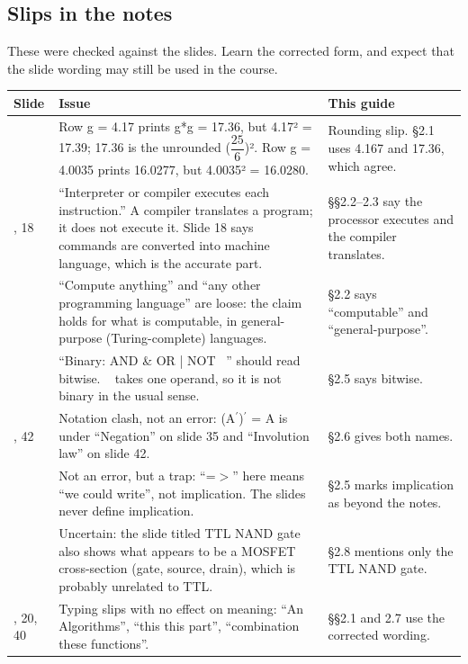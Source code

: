 \documentclass[11pt]{article}
\begin{document}
\begin{keepsection}
\section{Slips in the notes}

These were checked against the slides. Learn the corrected form, and expect that the slide wording may still be used in the course.

\begin{center}\small\begin{tabularx}{\linewidth}{>{\raggedright\arraybackslash}X>{\raggedright\arraybackslash}X>{\raggedright\arraybackslash}X}\toprule
\textbf{Slide} & \textbf{Issue} & \textbf{This guide} \\ \midrule
5 & Row g = 4.17 prints g*g = 17.36, but 4.17² = 17.39; 17.36 is the unrounded ({\small\ensuremath{\dfrac{25}{6}}})². Row g = 4.0035 prints 16.0277, but 4.0035² = 16.0280. & Rounding slip. §2.1 uses 4.167 and 17.36, which agree. \\
9, 18 & “Interpreter or compiler executes each instruction.” A compiler translates a program; it does not execute it. Slide 18 says commands are converted into machine language, which is the accurate part. & §§2.2–2.3 say the processor executes and the compiler translates. \\
10 & “Compute anything” and “any other programming language” are loose: the claim holds for what is computable, in general-purpose (Turing-complete) languages. & §2.2 says “computable” and “general-purpose”. \\
31 & “Binary: AND \& OR | NOT ~” should read bitwise. ~ takes one operand, so it is not binary in the usual sense. & §2.5 says bitwise. \\
35, 42 & Notation clash, not an error: (A\ensuremath{{}^{\prime}})\ensuremath{{}^{\prime}} = A is under “Negation” on slide 35 and “Involution law” on slide 42. & §2.6 gives both names. \\
24 & Not an error, but a trap: “=\ensuremath{>}” here means “we could write”, not implication. The slides never define implication. & §2.5 marks implication as beyond the notes. \\
49 & Uncertain: the slide titled TTL NAND gate also shows what appears to be a MOSFET cross-section (gate, source, drain), which is probably unrelated to TTL. & §2.8 mentions only the TTL NAND gate. \\
7, 20, 40 & Typing slips with no effect on meaning: “An Algorithms”, “this this part”, “combination these functions”. & §§2.1 and 2.7 use the corrected wording. \\
\bottomrule\end{tabularx}\end{center}
\end{keepsection}
\end{document}
